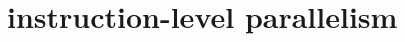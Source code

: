 \documentclass[aspectratio=169]{mytalk}
\title{}
\date{}
\begin{document}


\section{instruction-level parallelism}


\end{document}
